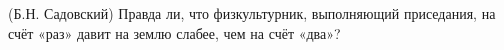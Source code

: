 (Б.Н. Садовский)
Правда ли, что физкультурник, выполняющий приседания, на счёт «раз»
давит на землю слабее, чем на счёт «два»?
